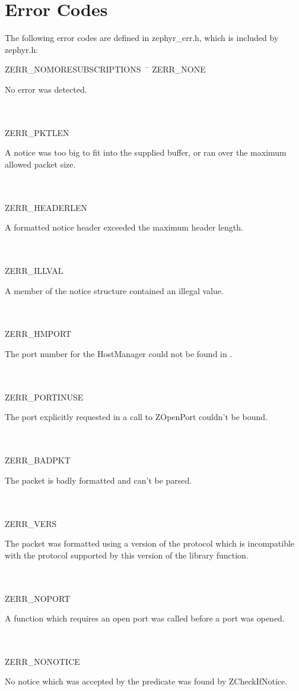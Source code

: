 %
\section{Error Codes}
\label{error-codes}

The following error codes are defined in zephyr_err.h, which
is included by zephyr.h:

\begin{tabbing}
ZERR_NOMORESUBSCRIPTIONS\ \ \= \kill
ZERR_NONE \> \parbox[t]{4in}{No error was detected.} \\
\\
ZERR_PKTLEN \> \parbox[t]{4in}{A notice was too big to fit into the supplied buffer,
or ran over the maximum allowed packet size.} \\
\\
ZERR_HEADERLEN \> \parbox[t]{4in}{A formatted notice header exceeded the
maximum header length.} \\
\\
ZERR_ILLVAL \> \parbox[t]{4in}{A member of the notice structure contained an illegal value.} \\
\\
ZERR_HMPORT \> \parbox[t]{4in}{The port number for the HostManager could not be found in
.} \\
\\
ZERR_PORTINUSE \> \parbox[t]{4in}{The port explicitly requested in a call to ZOpenPort
couldn't be bound.} \\
\\
ZERR_BADPKT \> \parbox[t]{4in}{The packet is badly formatted and can't be parsed.} \\
\\
ZERR_VERS \> \parbox[t]{4in}{The packet was formatted using a version of the
protocol which is incompatible with the protocol supported by this
version of the library function.} \\
\\
ZERR_NOPORT \> \parbox[t]{4in}{A function which requires an open port was called
before a port was opened.} \\
\\
ZERR_NONOTICE \> \parbox[t]{4in}{No notice which was accepted by the predicate was
found by ZCheckIfNotice.} \\

\end{tabbing}
